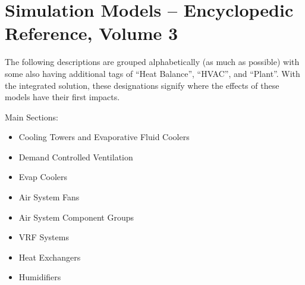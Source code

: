 \chapter{Simulation Models -- Encyclopedic Reference, Volume 3}\label{simulation-models---encyclopedic-reference-002}

The following descriptions are grouped alphabetically (as much as possible) with some also having additional tags of ``Heat Balance'', ``HVAC'', and ``Plant''. With the integrated solution, these designations signify where the effects of these models have their first impacts.

Main Sections:

\begin{itemize}
  \tightlist
  \item Cooling Towers and Evaporative Fluid Coolers
  \item Demand Controlled Ventilation
  \item Evap Coolers
  \item Air System Fans
  \item Air System Component Groups
  \item VRF Systems
  \item Heat Exchangers
  \item Humidifiers
\end{itemize}

